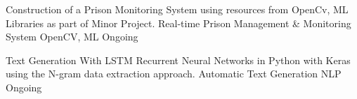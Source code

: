 


\begin{cventries}


\cventry
{Construction of a Prison Monitoring System using resources from OpenCv, ML Libraries as part of Minor Project.} %
{Real-time Prison Management \& Monitoring System} %
{OpenCV, ML} %
{Ongoing} %
{ %
\begin{cvitems}
\end{cvitems}
}


\cventry
{Text Generation With LSTM Recurrent Neural Networks in Python with Keras using the N-gram data extraction approach.} %
{Automatic Text Generation} %
{NLP} %
{Ongoing} %
{ %
\begin{cvitems}
\end{cvitems}
}


\end{cventries}